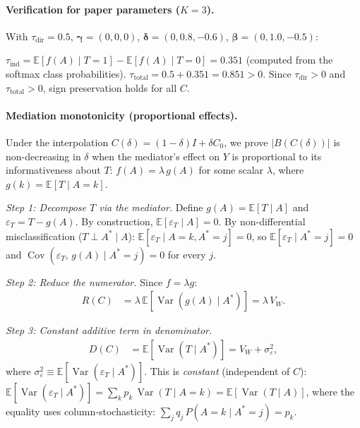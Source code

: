 \paragraph{Verification for paper parameters ($K{=}3$).}
With $\tau_{\mathrm{dir}}{=}0.5$, $\boldsymbol{\gamma}{=}(0,0,0)$, $\boldsymbol{\delta}{=}(0,0.8,{-}0.6)$, $\boldsymbol{\beta}{=}(0,1.0,{-}0.5)$:

$\tau_{\mathrm{ind}}=\mathbb{E}[f(A)\mid T{=}1]-\mathbb{E}[f(A)\mid T{=}0]=0.351$ (computed from the softmax class probabilities).
$\tau_{\mathrm{total}}=0.5+0.351=0.851>0$.
Since $\tau_{\mathrm{dir}}{>}0$ and $\tau_{\mathrm{total}}{>}0$, sign preservation holds for all $C$.

\paragraph{Mediation monotonicity (proportional effects).}
\label{par:med_monotone}

Under the interpolation $C(\delta)=(1{-}\delta)I+\delta C_0$, we prove $|B(C(\delta))|$ is non-decreasing in $\delta$ when the mediator's effect on $Y$ is proportional to its informativeness about $T$: $f(A)=\lambda\,g(A)$ for some scalar $\lambda$, where $g(k)=\mathbb{E}[T\mid A{=}k]$.

\emph{Step 1: Decompose $T$ via the mediator.}
Define $g(A)=\mathbb{E}[T\mid A]$ and $\varepsilon_T = T - g(A)$.
By construction, $\mathbb{E}[\varepsilon_T\mid A]=0$.
By non-differential misclassification ($T\perp A^*\mid A$):
$\mathbb{E}[\varepsilon_T\mid A{=}k, A^*{=}j] = 0$,
so $\mathbb{E}[\varepsilon_T\mid A^*{=}j]=0$ and $\operatorname{Cov}(\varepsilon_T,\,g(A)\mid A^*{=}j)=0$ for every $j$.

\emph{Step 2: Reduce the numerator.}
Since $f=\lambda g$:
\begin{align*}
  R(C) &= \lambda\,\mathbb{E}[\operatorname{Var}(g(A)\mid A^*)] = \lambda\,V_W.
\end{align*}

\emph{Step 3: Constant additive term in denominator.}
\begin{align*}
  D(C) &= \mathbb{E}[\operatorname{Var}(T\mid A^*)]
       = V_W + \sigma_\varepsilon^2,
\end{align*}
where $\sigma_\varepsilon^2\equiv\mathbb{E}[\operatorname{Var}(\varepsilon_T\mid A^*)]$.
This is \emph{constant} (independent of $C$):
$\mathbb{E}[\operatorname{Var}(\varepsilon_T\mid A^*)]
  = \sum_k p_k\,\operatorname{Var}(T\mid A{=}k)
  = \mathbb{E}[\operatorname{Var}(T\mid A)]$,
where the equality uses column-stochasticity: $\sum_j q_j\,P(A{=}k\mid A^*{=}j)=p_k$.


